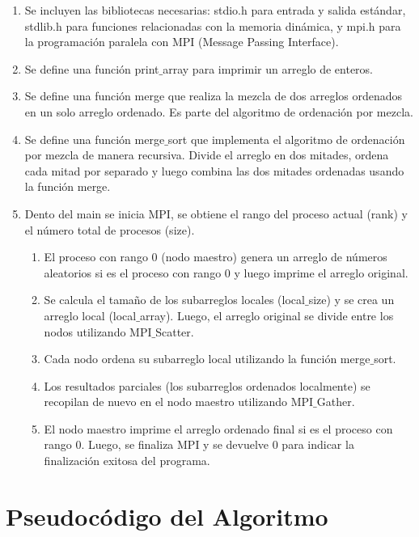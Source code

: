 \documentclass[a4paper,12pt]{article}
\begin{document}
\begin{enumerate}
    \item Se incluyen las bibliotecas necesarias: stdio.h para entrada y salida estándar, stdlib.h para funciones relacionadas con la memoria dinámica, y mpi.h para la programación paralela con MPI (Message Passing Interface).
    \item Se define una función print$\_$array para imprimir un arreglo de enteros.
    \item Se define una función merge que realiza la mezcla de dos arreglos ordenados en un solo arreglo ordenado. Es parte del algoritmo de ordenación por mezcla.
    \item Se define una función merge$\_$sort que implementa el algoritmo de ordenación por mezcla de manera recursiva. Divide el arreglo en dos mitades, ordena cada mitad por separado y luego combina las dos mitades ordenadas usando la función merge.
    \item Dento del main se inicia MPI, se obtiene el rango del proceso actual (rank) y el número total de procesos (size).
    \begin{enumerate}
        \item El proceso con rango 0 (nodo maestro) genera un arreglo de números aleatorios si es el proceso con rango 0 y luego imprime el arreglo original.
        \item Se calcula el tamaño de los subarreglos locales (local$\_$size) y se crea un arreglo local (local$\_$array). Luego, el arreglo original se divide entre los nodos utilizando MPI$\_$Scatter.
        \item Cada nodo ordena su subarreglo local utilizando la función merge$\_$sort.
        \item Los resultados parciales (los subarreglos ordenados localmente) se recopilan de nuevo en el nodo maestro utilizando MPI$\_$Gather.
        \item El nodo maestro imprime el arreglo ordenado final si es el proceso con rango 0. Luego, se finaliza MPI y se devuelve 0 para indicar la finalización exitosa del programa. 
    \end{enumerate}    
\end{enumerate}
        

\section*{Pseudocódigo del Algoritmo}
\end{document}
